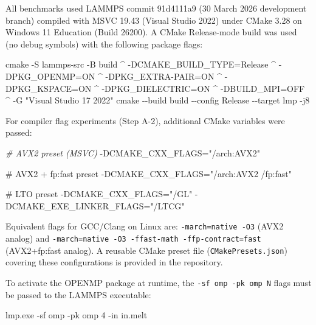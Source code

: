\documentclass[
  11pt,
]{article}
\newenvironment{Shaded}{}{}
\newcommand{\AttributeTok}[1]{\textcolor[rgb]{0.49,0.56,0.16}{#1}}
\newcommand{\CommentTok}[1]{\textcolor[rgb]{0.38,0.63,0.69}{\textit{#1}}}
\newcommand{\ExtensionTok}[1]{#1}
\newcommand{\FunctionTok}[1]{\textcolor[rgb]{0.02,0.16,0.49}{#1}}
\newcommand{\NormalTok}[1]{#1}
\begin{document}
All benchmarks used LAMMPS commit 91d4111a9 (30 March 2026 development
branch) compiled with MSVC 19.43 (Visual Studio 2022) under CMake 3.28
on Windows 11 Education (Build 26200). A CMake Release-mode build was
used (no debug symbols) with the following package flags:

\begin{Shaded}
\begin{Highlighting}[]
\FunctionTok{cmake {-}S lammps{-}src {-}B build \^{}}
\FunctionTok{  {-}DCMAKE\_BUILD\_TYPE=Release \^{}}
\FunctionTok{  {-}DPKG\_OPENMP=ON \^{}}
\FunctionTok{  {-}DPKG\_EXTRA{-}PAIR=ON \^{}}
\FunctionTok{  {-}DPKG\_KSPACE=ON \^{}}
\FunctionTok{  {-}DPKG\_DIELECTRIC=ON \^{}}
\FunctionTok{  {-}DBUILD\_MPI=OFF \^{}}
\FunctionTok{  {-}G "Visual Studio 17 2022"}
\FunctionTok{cmake {-}{-}build build {-}{-}config Release {-}{-}target lmp {-}j8}
\end{Highlighting}
\end{Shaded}

For compiler flag experiments (Step A-2), additional CMake variables
were passed:

\begin{Shaded}
\begin{Highlighting}[]
\CommentTok{\# AVX2 preset (MSVC)}
\NormalTok{{-}}\FunctionTok{DCMAKE\_CXX\_FLAGS="/arch:AVX2"}

\FunctionTok{\# AVX2 + fp:fast preset}
\FunctionTok{{-}DCMAKE\_CXX\_FLAGS="/arch:AVX2 /fp:fast"}

\FunctionTok{\# LTO preset}
\FunctionTok{{-}DCMAKE\_CXX\_FLAGS="/GL" {-}DCMAKE\_EXE\_LINKER\_FLAGS="/LTCG"}
\end{Highlighting}
\end{Shaded}

Equivalent flags for GCC/Clang on Linux are: \texttt{-march=native\ -O3}
(AVX2 analog) and
\texttt{-march=native\ -O3\ -ffast-math\ -ffp-contract=fast}
(AVX2+fp:fast analog). A reusable CMake preset file
(\texttt{CMakePresets.json}) covering these configurations is provided
in the repository.

To activate the OPENMP package at runtime, the
\texttt{-sf\ omp\ -pk\ omp\ N} flags must be passed to the LAMMPS
executable:

\begin{Shaded}
\begin{Highlighting}[]
\ExtensionTok{lmp.exe} \AttributeTok{{-}sf}\NormalTok{ omp }\AttributeTok{{-}pk}\NormalTok{ omp 4 }\AttributeTok{{-}in}\NormalTok{ in.melt}
\end{Highlighting}
\end{Shaded}
\end{document}
